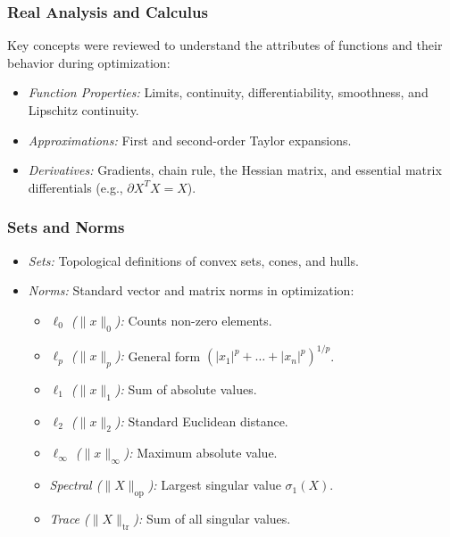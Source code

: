 \documentclass[conference]{IEEEtran}
\begin{document}
\subsubsection{Real Analysis and Calculus}
Key concepts were reviewed to understand the attributes of functions and their behavior during optimization:
\begin{itemize}
    \item \textit{Function Properties:} Limits, continuity, differentiability, smoothness, and Lipschitz continuity.
    \item \textit{Approximations:} First and second-order Taylor expansions.
    \item \textit{Derivatives:} Gradients, chain rule, the Hessian matrix, and essential matrix differentials (e.g., $\partial X^T X = X$).
\end{itemize}

\subsubsection{Sets and Norms}
\begin{itemize}
    \item \textit{Sets:} Topological definitions of convex sets, cones, and hulls.
    \item \textit{Norms:} Standard vector and matrix norms in optimization:
    \begin{itemize}
        \item[\textbullet] \textit{$\ell_0$ ($\|x\|_0$):} Counts non-zero elements.
        \item[\textbullet] \textit{$\ell_p$ ($\|x\|_p$):} General form $(|x_1|^p + \dots + |x_n|^p)^{1/p}$.
        \item[\textbullet] \textit{$\ell_1$ ($\|x\|_1$):} Sum of absolute values.
        \item[\textbullet] \textit{$\ell_2$ ($\|x\|_2$):} Standard Euclidean distance.
        \item[\textbullet] \textit{$\ell_\infty$ ($\|x\|_\infty$):} Maximum absolute value.
        \item[\textbullet] \textit{Spectral ($\|X\|_{\text{op}}$):} Largest singular value $\sigma_1(X)$.
        \item[\textbullet] \textit{Trace ($\|X\|_{\text{tr}}$):} Sum of all singular values.
    \end{itemize}
\end{itemize}
\end{document}
